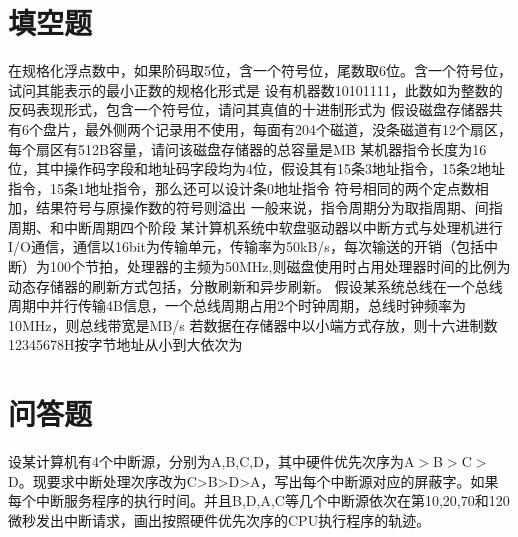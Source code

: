 \documentclass[a4paper]{exam}
\newif\ifprint
\newcommand{\blank}[2][1cm]{\uline{\makebox[#1][c]{%
			\ifprint
			\phantom{#2}%
			\else
			#2%
			\fi}}}
\begin{document}
\section{填空题}
\begin{questions}
	\question 在规格化浮点数中，如果阶码取5位，含一个符号位，尾数取6位。含一个符号位，试问其能表示的最小正数的规格化形式是\blank{}
	\question 设有机器数10101111，此数如为整数的反码表现形式，包含一个符号位，请问其真值的十进制形式为\blank{}
	\question 假设磁盘存储器共有6个盘片，最外侧两个记录用不使用，每面有204个磁道，没条磁道有12个扇区，每个扇区有512B容量，请问该磁盘存储器的总容量是\blank{}MB
	\question 某机器指令长度为16位，其中操作码字段和地址码字段均为4位，假设其有15条3地址指令，15条2地址指令，15条1地址指令，那么还可以设计\blank{}条0地址指令
	\question 符号相同的两个定点数相加，结果符号与原操作数的符号\blank{}则溢出
	\question 一般来说，指令周期分为取指周期、间指周期、\blank{}和中断周期四个阶段
	\question 某计算机系统中软盘驱动器以中断方式与处理机进行I/O通信，通信以16bit为传输单元，传输率为50kB/s，每次输送的开销（包括中断）为100个节拍，处理器的主频为50MHz,则磁盘使用时占用处理器时间的比例为\blank{}
	\question 动态存储器的刷新方式包括\blank{}，分散刷新和异步刷新。
	\question 假设某系统总线在一个总线周期中并行传输4B信息，一个总线周期占用2个时钟周期，总线时钟频率为10MHz，则总线带宽是\blank{}MB/s
	\question 若数据在存储器中以小端方式存放，则十六进制数12345678H按字节地址从小到大依次为\blank{}
\end{questions}

\section{问答题}
\begin{questions}
	\question 设某计算机有4个中断源，分别为A,B,C,D，其中硬件优先次序为A$>$B$>$C$>$D。现要求中断处理次序改为C>B>D>A，写出每个中断源对应的屏蔽字。如果每个中断服务程序的执行时间。并且B,D,A,C等几个中断源依次在第10,20,70和120微秒发出中断请求，画出按照硬件优先次序的CPU执行程序的轨迹。
\end{questions}
\end{document}
